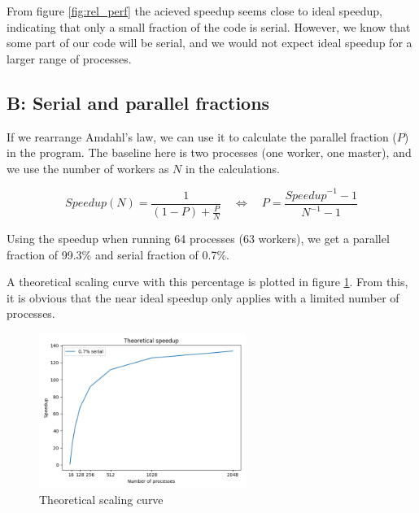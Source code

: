 \documentclass{article}
\begin{document}
From figure \ref{fig:rel_perf} the acieved speedup seems close to ideal speedup, indicating that only a small fraction of the code is serial. However, we know that some part of our code will be serial, and we would not expect ideal speedup for a larger range of processes.

\subsection*{B: Serial and parallel fractions}


If we rearrange Amdahl's law, we can use it to calculate the parallel fraction ($P$) in the program. The baseline here is two processes (one worker, one master), and we use the number of workers as $N$ in the calculations.

\begin{equation*}
    Speedup(N) = \frac{1}{(1-P) + \frac{P}{N}} 
    \hspace{1em} \Leftrightarrow \hspace{1em}
    P = \frac{ {Speedup}^{-1} - 1}{{N}^{-1} - 1}
\end{equation*}

Using the speedup when running 64 processes (63 workers), we get a parallel fraction of 99.3\% and serial fraction of 0.7\%.

A theoretical scaling curve with this percentage is plotted in figure \ref{fig:theo}. From this, it is obvious that the near ideal speedup only applies with a limited number of processes.

\begin{figure}[h!]
    \centering
    \includegraphics[width=0.6\textwidth]{img/theo_speedup.png}
    \caption{Theoretical scaling curve}
    \label{fig:theo}
\end{figure}
\end{document}

